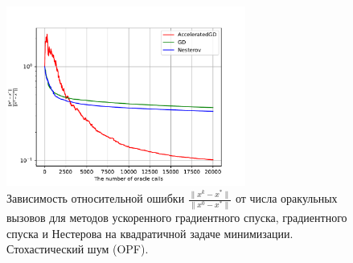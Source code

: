 \documentclass{article}
\begin{document}
\begin{figure}[!htbp]
\centering
  \includegraphics[width=0.7\textwidth]{../figures/Stochastic_quadratic_AGD_GD_Nesterov_18.pdf}
 \caption{Зависимость относительной ошибки $\frac{\|x^k - x^*\|}{\|x^0 - x^*\|}$ от числа оракульных вызовов для методов ускоренного градиентного спуска, градиентного спуска и Нестерова на квадратичной задаче минимизации. Стохастический шум (OPF).}
  \label{fig:non-stochastic_logreg}
\end{figure}
\end{document}

